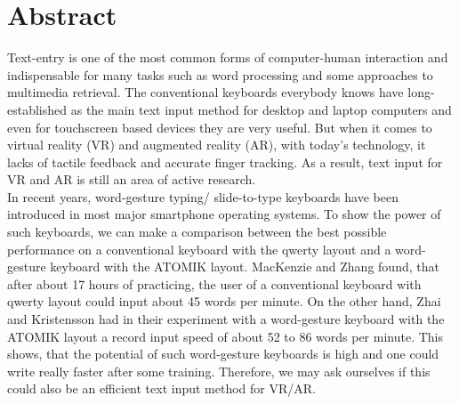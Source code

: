 \chapter{Abstract}
Text-entry is one of the most common forms of computer-human interaction and indispensable for many tasks such as word processing and some approaches to multimedia retrieval. The conventional keyboards everybody knows have long-established as the main text input method for desktop and laptop computers and even for touchscreen based devices they are very useful. But when it comes to virtual reality (VR) and augmented reality (AR), with today's technology, it lacks of tactile feedback and accurate finger tracking. As a result, text input for VR and AR is still an area of active research.\\
In recent years, word-gesture typing/ slide-to-type keyboards have been introduced in most major smartphone operating systems. To show the power of such keyboards, we can make a comparison between the best possible performance on a conventional keyboard with the qwerty layout and a word-gesture keyboard with the ATOMIK layout. MacKenzie and Zhang \cite{10.1145/302979.302983} found, that after about 17 hours of practicing, the user of a conventional keyboard with qwerty layout could input about 45 words per minute. On the other hand, Zhai and Kristensson \cite{Kristensson2004SHARK2AL} had in their experiment with a word-gesture keyboard with the ATOMIK layout a record input speed of about 52 to 86 words per minute. This shows, that the potential of such word-gesture keyboards is high and one could write really faster after some training. Therefore, we may ask ourselves if this could also be an efficient text input method for VR/AR.